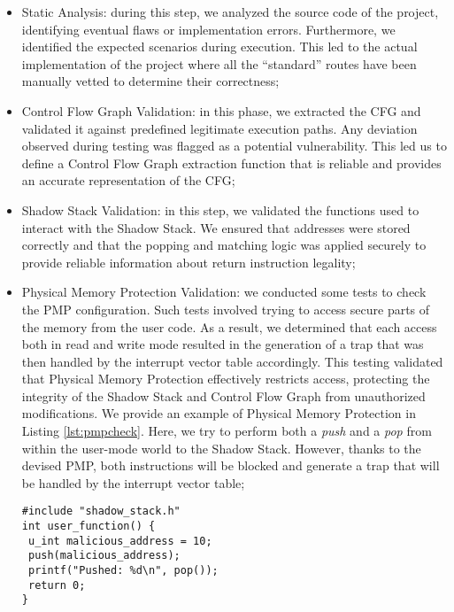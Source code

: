\begin{itemize}
  \item Static Analysis: during this step, we analyzed the source code of the project,
    identifying eventual flaws or implementation errors. Furthermore, we
    identified the expected scenarios during execution. This led to the actual implementation
    of the project where all the ``standard'' routes have been manually vetted to
    determine their correctness;

  \item Control Flow Graph Validation: in this phase, we extracted the CFG and validated
    it against predefined legitimate execution paths. Any deviation observed
    during testing was flagged as a potential vulnerability. This led us to define
    a Control Flow Graph extraction function that is reliable and provides an accurate
    representation of the CFG;

  \item Shadow Stack Validation: in this step, we validated the functions used to
    interact with the Shadow Stack. We ensured that addresses were stored
    correctly and that the popping and matching logic was applied securely to
    provide reliable information about return instruction legality;

  \item Physical Memory Protection Validation: we conducted some tests to check
    the PMP configuration. Such tests involved trying to access secure parts of the
    memory from the user code. As a result, we determined that each access both in
    read and write mode resulted in the generation of a trap that was then handled
    by the interrupt vector table accordingly. This testing validated that
    Physical Memory Protection effectively restricts access, protecting the integrity
    of the Shadow Stack and Control Flow Graph from unauthorized modifications.
    We provide an example of Physical Memory Protection in Listing
    \ref{lst:pmpcheck}. Here, we try to perform both a \textit{push} and a \textit{pop}
    from within the user-mode world to the Shadow Stack. However, thanks to the
    devised PMP, both instructions will be blocked and generate a trap that will
    be handled by the interrupt vector table;

    \begin{lstlisting}[style=CStyle, caption = PMP configuration validation, label={lst:pmpcheck}]
#include "shadow_stack.h"
int user_function() {
 u_int malicious_address = 10;
 push(malicious_address);
 printf("Pushed: %d\n", pop());
 return 0;
}
 \end{lstlisting}


\end{itemize}
